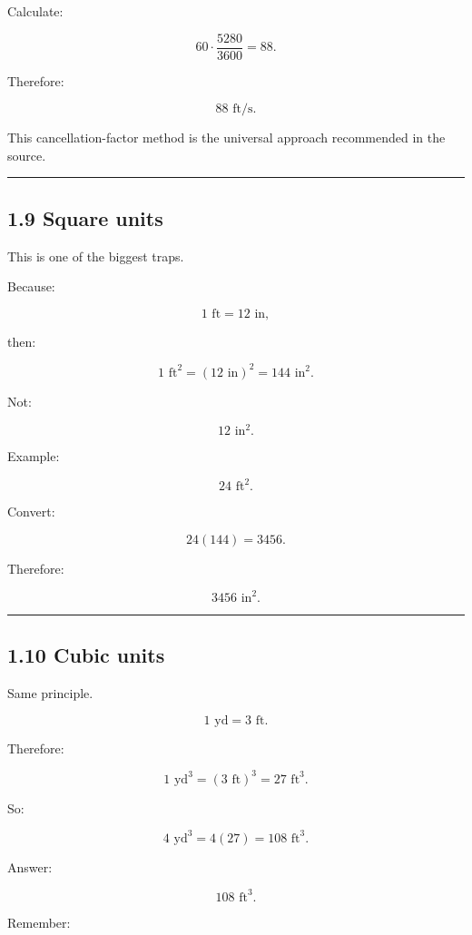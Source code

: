\documentclass[
]{article}
\begin{document}
Calculate:

\[
60\cdot\frac{5280}{3600}=88.
\]

Therefore:

\[
\boxed{88\text{ ft/s}}.
\]

This cancellation-factor method is the universal approach recommended in
the source.

\begin{center}\rule{0.5\linewidth}{0.5pt}\end{center}

\subsection{1.9 Square units}\label{square-units}

This is one of the biggest traps.

Because:

\[
1\text{ ft}=12\text{ in},
\]

then:

\[
1\text{ ft}^2
=
(12\text{ in})^2
=
144\text{ in}^2.
\]

Not:

\[
12\text{ in}^2.
\]

Example:

\[
24\text{ ft}^2.
\]

Convert:

\[
24(144)=3456.
\]

Therefore:

\[
\boxed{3456\text{ in}^2}.
\]

\begin{center}\rule{0.5\linewidth}{0.5pt}\end{center}

\subsection{1.10 Cubic units}\label{cubic-units}

Same principle.

\[
1\text{ yd}=3\text{ ft}.
\]

Therefore:

\[
1\text{ yd}^3=(3\text{ ft})^3=27\text{ ft}^3.
\]

So:

\[
4\text{ yd}^3=4(27)=108\text{ ft}^3.
\]

Answer:

\[
\boxed{108\text{ ft}^3}.
\]

Remember:
\end{document}
